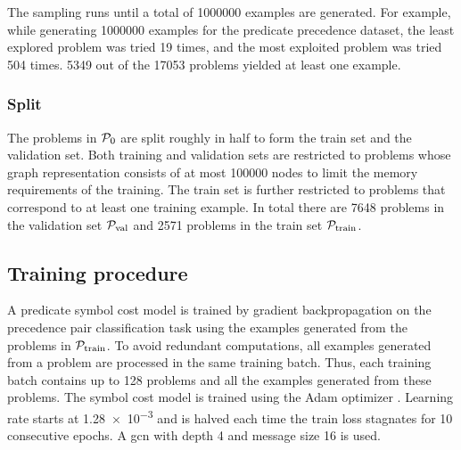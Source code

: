 The sampling runs until a total of \num{1000000} examples are generated.
For example, while generating \num{1000000} examples for the predicate precedence dataset,
the least explored problem was tried 19 times, and the most exploited problem was tried 504 times.
\num{5349} out of the \num{17053} problems yielded at least one example.

\subsubsection{Split}

The problems in $\operatorname{\mathcal{P}_{0}}$ are split roughly in half to form the train set and the validation set.
Both training and validation sets are restricted to problems whose graph representation consists of at most \num{100000} nodes
to limit the memory requirements of the training.
The train set is further restricted to problems that correspond to at least one training example.
In total there are \num{7648} problems in the validation set $\operatorname{\mathcal{P}_{\mathrm{val}}}$
and \num{2571} problems in the train set $\operatorname{\mathcal{P}_{\mathrm{train}}}$.

\subsection{Training procedure}

A predicate symbol cost model is trained by gradient backpropagation
on the precedence pair classification task
using the examples generated from the problems in $\operatorname{\mathcal{P}_{\mathrm{train}}}$.
To avoid redundant computations, all examples generated from a problem are processed in the same training batch.
Thus, each training batch contains up to \num{128} problems and all the examples generated from these problems.
The symbol cost model is trained using the Adam optimizer \cite{Kingma2014}.
Learning rate starts at \num{1.28e-3}
and is halved each time the train loss stagnates for 10 consecutive epochs.
A \gls{gcn} with depth 4 and message size 16 is used.

